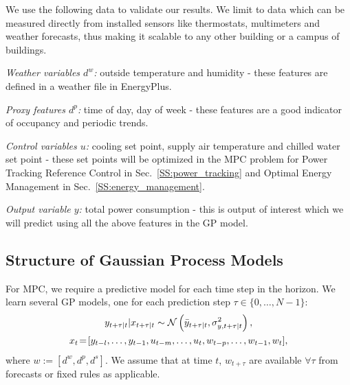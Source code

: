 We use the following data to validate our results. We limit to data which can be measured directly from installed sensors like thermostats, multimeters and weather forecasts, thus making it scalable to any other building or a campus of buildings.

\textit{Weather variables \(d^w\):} outside temperature and humidity - these features are defined in a weather file in EnergyPlus.

\textit{Proxy features \(d^p\):} time of day, day of week - these features are a good indicator of occupancy and periodic trends.

\textit{Control variables \(u\):} cooling set point, supply air temperature and chilled water set point - these set points will be optimized in the MPC problem for Power Tracking Reference Control in Sec.~\ref{SS:power_tracking} and Optimal Energy Management in Sec.~\ref{SS:energy_management}.

\textit{Output variable \(y\):} total power consumption - this is output of interest which we will predict using all the above features in the GP model.

\subsection{Structure of  Gaussian Process Models}
\label{SS:casestudy:gp}

For MPC, we require a predictive model for each time step in the horizon.
We learn several GP models, one for each prediction step \( \tau \in \{0,\dots,N-1\}\):
\begin{gather}
\label{E:gp:casestudy}
y_{t+\tau|t} | x_{t+\tau|t} \sim \GaussianDist{\bar{y}_{t+\tau|t}}{\sigma^2_{y,t+\tau|t}}, \\
x_{t}\!=\![y_{t-l}, \dots, y_{t-1}, u_{t-m}, \dots, u_t, w_{t-p}, \dots, w_{t-1}, w_t], \nonumber
\end{gather}
where \(w:=[d^w, d^p, d^s]\). We assume that at time \(t\), \(w_{t+\tau}\) are available \(\forall \tau \) from forecasts or fixed rules as applicable.

